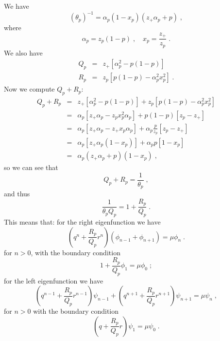 \documentclass[a4paper,10pt]{article}
\begin{document}
We have 
\begin{equation*}
 (\theta_p)^{-1} = \alpha_p(1-x_p)(z_+\alpha_p+p) \;, 
\end{equation*}
where
\begin{equation*}
 \alpha_p = z_p(1-p)\;, \quad x_p = \frac{z_+}{z_p} \;. 
\end{equation*}
We also have 
\begin{eqnarray}
 Q_p &=& z_+[\alpha_p^2 - p(1-p)] \nonumber \\
 R_p &=& z_p[p(1-p)-\alpha_p^2 x_p^2] \nonumber \;.
\end{eqnarray}
Now we compute $Q_p + R_p$:
\begin{eqnarray}
 Q_p + R_p &=& z_+[\alpha_p^2 - p(1-p)] + z_p[p(1-p)-\alpha_p^2 x_p^2] \nonumber \\
           &=& \alpha_p[z_+\alpha_p -z_px_p^2\alpha_p] +p(1-p)[z_p-z_+] \nonumber \\
           &=& \alpha_p[z_+\alpha_p -z_+x_p\alpha_p] +\alpha_p \frac{p}{z_p}[z_p-z_+] \nonumber \\
           &=& \alpha_p[z_+\alpha_p(1- x_p)] + \alpha_p p[1-x_p] \nonumber \\
           &=& \alpha_p(z_+\alpha_p+p)(1-x_p) \;, 
\end{eqnarray}
so we can see that
\begin{equation}
  Q_p + R_p = \frac{1}{\theta_p} \;,
\end{equation}
and thus
\begin{equation}
  \frac{1}{\theta_pQ_p} = 1 + \frac{R_p}{Q_p} \;.
\end{equation}
This means that: for the right eigenfunction we have
\begin{equation}
 \left( q^n + \frac{R_p}{Q_p} r^n \right) \left( \phi_{n-1} + \phi_{n+1} \right) = \mu \phi_n \;. 
\end{equation}
for $n>0$, with the boundary condition
\begin{equation}
 1 + \frac{R_p}{Q_p} \phi_1 = \mu \phi_0 \;;
\end{equation}
for the left eigenfunction we have
\begin{equation}
 \left( q^{n-1} + \frac{R_p}{Q_p} r^{n-1} \right) \psi_{n-1} + \left( q^{n+1} + \frac{R_p}{Q_p} r^{n+1} \right) \psi_{n+1} = \mu \psi_n \;, 
\end{equation}
for $n>0$ with the boundary condition
\begin{equation}
 \left( q + \frac{R_p}{Q_p} r \right) \psi_1 = \mu \psi_0 \;.
\end{equation}




\end{document}
